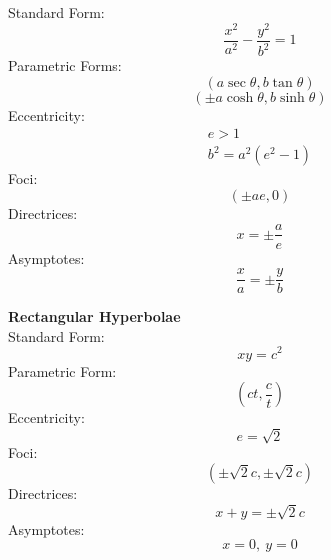 \documentclass{book}
\begin{document}
            Standard Form:
            \begin{equation}
                \frac{x^2}{a^2}-\frac{y^2}{b^2}=1
            \end{equation}
            Parametric Forms:
            \begin{equation}
                (a\sec\theta,b\tan\theta)
            \end{equation}
            \begin{equation}
                (\pm a\cosh\theta,b\sinh\theta)
            \end{equation}
            Eccentricity:
            \begin{equation}
                \begin{gathered}
                    e>1 \\
                    b^2=a^2(e^2-1)
                \end{gathered}
            \end{equation}
            Foci:
            \begin{equation}
                (\pm ae,0)
            \end{equation}
            Directrices:
            \begin{equation}
                x=\pm\frac{a}{e}
            \end{equation}
            Asymptotes:
            \begin{equation}
                \frac{x}{a}=\pm\frac{y}{b}
            \end{equation}

            \noindent\textbf{Rectangular Hyperbolae} \\

            Standard Form:
            \begin{equation}
                xy=c^2
            \end{equation}
            Parametric Form:
            \begin{equation}
                \left(ct,\frac{c}{t}\right)
            \end{equation}
            Eccentricity:
            \begin{equation}
                e=\sqrt{2}
            \end{equation}
            Foci:
            \begin{equation}
                (\pm\sqrt{2}c,\pm\sqrt{2}c)
            \end{equation}
            Directrices:
            \begin{equation}
                x+y=\pm\sqrt{2}c
            \end{equation}
            Asymptotes:
            \begin{equation}
                x=0,\ y=0
            \end{equation}
\end{document}
